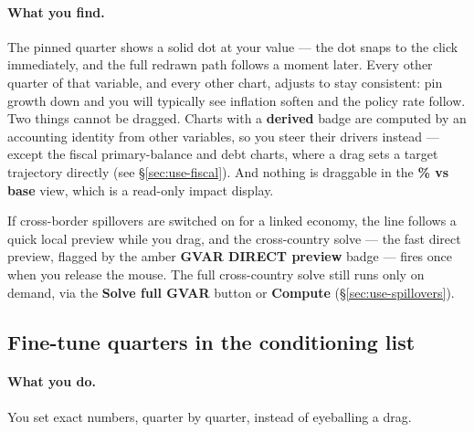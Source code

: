 \documentclass[11pt]{article}
\theoremstyle{definition}
\theoremstyle{remark}
\begin{document}
\paragraph{What you find.} The pinned quarter shows a solid dot at your value ---
the dot snaps to the click immediately, and the full redrawn path follows a moment
later. Every other quarter of that variable, and every other chart, adjusts to stay
consistent: pin growth down and you will typically see inflation soften and the
policy rate follow. Two things cannot be dragged. Charts with a \textbf{derived}
badge are computed by an accounting identity from other variables, so you steer
their drivers instead --- except the fiscal primary-balance and debt charts, where a
drag sets a target trajectory directly (see \S\ref{sec:use-fiscal}). And nothing is
draggable in the \textbf{\% vs base} view, which is a read-only impact display.

If cross-border spillovers are switched on for a linked economy, the line follows a
quick local preview while you drag, and the cross-country solve --- the fast direct
preview, flagged by the amber \textbf{GVAR DIRECT preview} badge --- fires once when
you release the mouse. The full cross-country solve still runs only on demand, via
the \textbf{Solve full GVAR} button or \textbf{Compute}
(\S\ref{sec:use-spillovers}).

\subsection{Fine-tune quarters in the conditioning list}

\paragraph{What you do.} You set exact numbers, quarter by quarter, instead of
eyeballing a drag.
\end{document}
